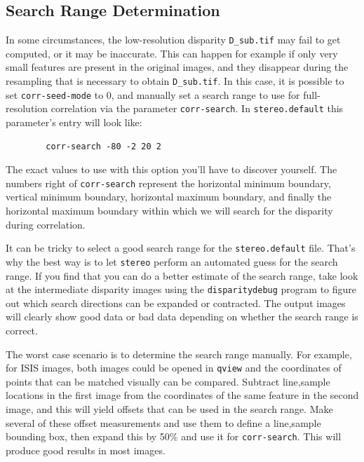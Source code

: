\subsection{Search Range Determination}
\label{sec:search_range}

In some circumstances, the low-resolution
disparity \texttt{D\_sub.tif} may fail to get computed, or it may be
inaccurate. This can happen for example if only very small features are
present in the original images, and they disappear during the resampling
that is necessary to obtain \texttt{D\_sub.tif}. In this case, it is
possible to set \texttt{corr-seed-mode} to 0, and manually set a search
range to use for full-resolution correlation via the parameter
\texttt{corr-search}. In \texttt{stereo.default} this parameter's entry
will look like:

\begin{verbatim}
        corr-search -80 -2 20 2
\end{verbatim}

The exact values to use with this option you'll have to discover
yourself. The numbers right of \texttt{corr-search} represent the
horizontal minimum boundary, vertical minimum boundary, horizontal
maximum boundary, and finally the horizontal maximum boundary within
which we will search for the disparity during correlation.

It can be tricky to select a good search range for the \texttt{stereo.default} file.
That's why the best way is to let \texttt{stereo} perform an automated
guess for the search range. If you find that you can do a
better estimate of the search range, take look at the intermediate
disparity images using the \texttt{disparitydebug} program to figure
out which search directions can be expanded or contracted. The output
images will clearly show good data or bad data depending on whether
the search range is correct.

The worst case scenario is to determine the search range manually. For
example, for ISIS images, both images could be opened in \texttt{qview}
and the coordinates of points that can be matched visually can be
compared. Subtract line,sample locations in the first image from the
coordinates of the same feature in the second image, and this will yield
offsets that can be used in the search range.  Make several of these
offset measurements and use them to define a line,sample bounding box,
then expand this by 50\% and use it for \texttt{corr-search}.  This will
produce good results in most images.

